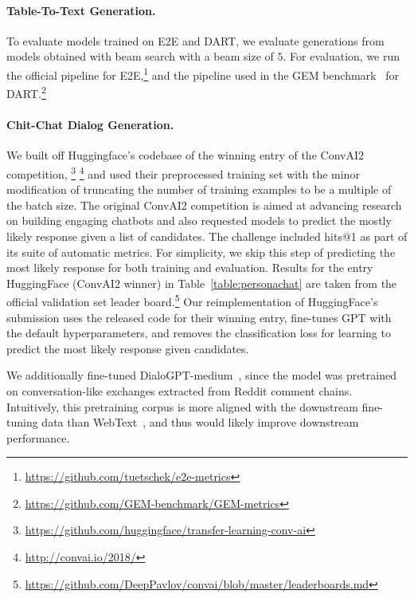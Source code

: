 \paragraph{Table-To-Text Generation.}
To evaluate models trained on E2E and DART, we evaluate generations from models obtained with beam search with a beam size of $5$.
For evaluation, we run the official pipeline for E2E,\footnote{\url{https://github.com/tuetschek/e2e-metrics}} and the pipeline used in the GEM benchmark~\citep{gehrmann2021gem} for DART.\footnote{\url{https://github.com/GEM-benchmark/GEM-metrics}}

\paragraph{Chit-Chat Dialog Generation.}
We built off Huggingface's codebase of the winning entry of the ConvAI2 competition,
\footnote{\url{https://github.com/huggingface/transfer-learning-conv-ai}}
\footnote{\url{http://convai.io/2018/}} and used their preprocessed training set with the minor modification of truncating the number of training examples to be a multiple of the batch size.
The original ConvAI2 competition is aimed at advancing research on building engaging chatbots and also requested models to predict the mostly likely response given a list of candidates.
The challenge included hits@1 as part of its suite of automatic metrics.
For simplicity, we skip this step of predicting the most likely response for both training and evaluation. 
Results for the entry HuggingFace (ConvAI2 winner) in Table~\ref{table:personachat} are taken from the official validation set leader board.\footnote{\url{https://github.com/DeepPavlov/convai/blob/master/leaderboards.md}}
Our reimplementation of HuggingFace's submission uses the released code for their winning entry, fine-tunes GPT with the default hyperparameters, and removes the classification loss for learning to predict the most likely response given candidates.

We additionally fine-tuned DialoGPT-medium~\citep{zhang2019dialogpt}, since the model was pretrained on conversation-like exchanges extracted from Reddit comment chains. Intuitively, this pretraining corpus is more aligned with the downstream fine-tuning data than WebText~\citep{radford2019language}, and thus would likely improve downstream performance.

